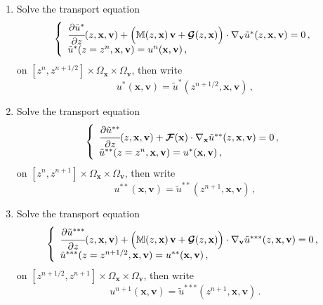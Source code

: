 \documentclass[10pt]{article}
\newcommand{\D}{{\partial}}
\begin{document}
\begin{enumerate}
\item Solve the transport equation
\begin{equation} \label{advection_v}
\left\{
\begin{array}{l}
\cfrac{\D \tilde{u}^{*}}{\D z}(z,\mathbf{x},\mathbf{v}) + \Big( \mathbb{M}(z,\mathbf{x})\,\mathbf{v} + \bm{\mathcal{G}}(z,\mathbf{x})\Big) \cdot \nabla_{\mathbf{v}}\tilde{u}^{*}(z,\mathbf{x},\mathbf{v}) = 0  \, , \\
\tilde{u}^{*}(z=z^{n},\mathbf{x},\mathbf{v}) = u^{n}(\mathbf{x},\mathbf{v}) \, ,
\end{array}
\right.
\end{equation}
on $[z^{n},z^{n+1/2}] \times \Omega_{\mathbf{x}} \times \Omega_{\mathbf{v}}$, then write
\begin{equation}
u^{*}(\mathbf{x},\mathbf{v}) = \tilde{u}^{*}(z^{n+1/2},\mathbf{x},\mathbf{v}) \, ,
\end{equation}
\item Solve the transport equation
\begin{equation} \label{advection_x}
\left\{
\begin{array}{l}
\cfrac{\D \tilde{u}^{**}}{\D z}(z,\mathbf{x},\mathbf{v}) + \bm{\mathcal{F}}(\mathbf{x}) \cdot \nabla_{\mathbf{x}}\tilde{u}^{**}(z,\mathbf{x},\mathbf{v}) = 0  \, , \\
\tilde{u}^{**}(z=z^{n},\mathbf{x},\mathbf{v}) = u^{*}(\mathbf{x},\mathbf{v}) \, ,
\end{array}
\right.
\end{equation}
on $[z^{n},z^{n+1}] \times \Omega_{\mathbf{x}} \times \Omega_{\mathbf{v}}$, then write
\begin{equation}
u^{**}(\mathbf{x},\mathbf{v}) = \tilde{u}^{**}(z^{n+1},\mathbf{x},\mathbf{v}) \, ,
\end{equation}
\item Solve the transport equation
\begin{equation} \label{advection_v2}
\left\{
\begin{array}{l}
\cfrac{\D \tilde{u}^{***}}{\D z}(z,\mathbf{x},\mathbf{v}) + \Big( \mathbb{M}(z,\mathbf{x})\,\mathbf{v} + \bm{\mathcal{G}}(z,\mathbf{x})\Big) \cdot \nabla_{\mathbf{v}}\tilde{u}^{***}(z,\mathbf{x},\mathbf{v}) = 0  \, , \\
\tilde{u}^{***}(z=z^{n+1/2},\mathbf{x},\mathbf{v}) = u^{**}(\mathbf{x},\mathbf{v}) \, ,
\end{array}
\right.
\end{equation}
on $[z^{n+1/2},z^{n+1}] \times \Omega_{\mathbf{x}} \times \Omega_{\mathbf{v}}$, then write
\begin{equation}
u^{n+1}(\mathbf{x},\mathbf{v}) = \tilde{u}^{***}(z^{n+1},\mathbf{x},\mathbf{v}) \, .
\end{equation}
\end{enumerate}
\end{document}
